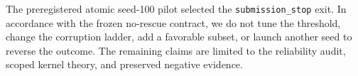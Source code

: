 The preregistered atomic seed-100 pilot selected the
\texttt{submission\_stop} exit. In accordance with the frozen no-rescue
contract, we do not tune the threshold, change the corruption ladder,
add a favorable subset, or launch another seed to reverse the outcome.
The remaining claims are limited to the reliability audit, scoped
kernel theory, and preserved negative evidence.
